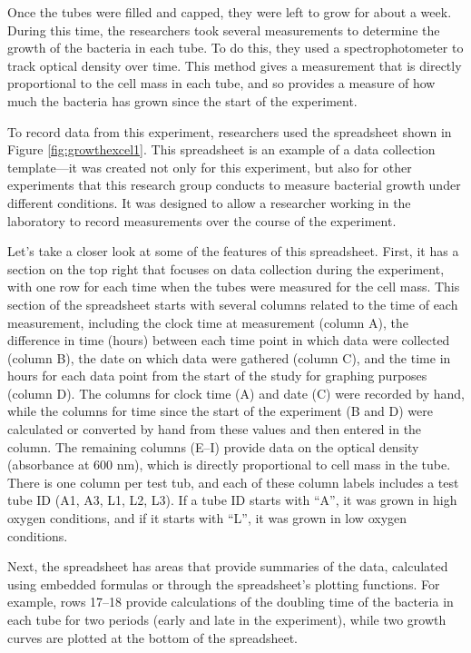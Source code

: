 \documentclass[]{tufte-book}
\begin{document}
Once the tubes were filled and capped, they were left to grow for about a week.
During this time, the researchers took several measurements to determine the
growth of the bacteria in each tube. To do this, they used a spectrophotometer
to track optical density over time. This method gives a measurement that is
directly proportional to the cell mass in each tube, and so provides a measure
of how much the bacteria has grown since the start of the experiment.

To record data from this experiment, researchers used the spreadsheet shown in
Figure \ref{fig:growthexcel1}. This spreadsheet is an example of a data
collection template---it was created not only for this experiment, but also for
other experiments that this research group conducts to measure bacterial growth
under different conditions. It was designed to allow a researcher working in the
laboratory to record measurements over the course of the experiment.

Let's take a closer look at some of the features of this spreadsheet. First, it
has a section on the top right that focuses on data collection during the
experiment, with one row for each time when the tubes were measured for the cell
mass. This section of the spreadsheet starts with several
columns related to the time of each measurement, including the clock time at
measurement (column A), the difference in time (hours) between each time point
in which data were collected (column B), the date on which data were gathered
(column C), and the time in hours for each data point from the start of the
study for graphing purposes (column D). The columns for clock time (A) and date
(C) were recorded by hand, while the columns for time since the start of the
experiment (B and D) were calculated or converted by hand from these values and
then entered in the column. The remaining columns (E--I) provide data on the
optical density (absorbance at 600 nm), which is directly proportional to cell
mass in the tube. There is one column per test tub, and each of these column
labels includes a test tube ID (A1, A3, L1, L2, L3). If a tube ID starts with
``A'', it was grown in high oxygen conditions, and if it starts with ``L'', it was
grown in low oxygen conditions.

Next, the spreadsheet has areas that provide summaries of the data, calculated
using embedded formulas or through the spreadsheet's plotting functions. For
example, rows 17--18 provide calculations of the doubling time of the bacteria
in each tube for two periods (early and late in the experiment), while two
growth curves are plotted at the bottom of the spreadsheet.
\end{document}

